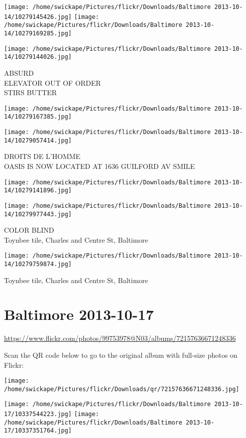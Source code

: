 \documentclass[10pt,letterpaper]{article}
\begin{document}
\texttt{[image: /home/swickape/Pictures/flickr/Downloads/Baltimore 2013-10-14/10279145426.jpg]}
\texttt{[image: /home/swickape/Pictures/flickr/Downloads/Baltimore 2013-10-14/10279169285.jpg]}

\texttt{[image: /home/swickape/Pictures/flickr/Downloads/Baltimore 2013-10-14/10279144026.jpg]}

ABSURD\\
ELEVATOR OUT OF ORDER\\
STIRS BUTTER
\pagebreak

\texttt{[image: /home/swickape/Pictures/flickr/Downloads/Baltimore 2013-10-14/10279167385.jpg]}

\vspace{0.25in}
\texttt{[image: /home/swickape/Pictures/flickr/Downloads/Baltimore 2013-10-14/10279057414.jpg]}

DROITS DE L'HOMME\\
OASIS IS NOW LOCATED AT 1636 GUILFORD AV SMILE
\pagebreak

\texttt{[image: /home/swickape/Pictures/flickr/Downloads/Baltimore 2013-10-14/10279141896.jpg]}

\vspace{0.25in}
\texttt{[image: /home/swickape/Pictures/flickr/Downloads/Baltimore 2013-10-14/10279977443.jpg]}

COLOR BLIND\\
Toynbee tile, Charles and Centre St, Baltimore
\pagebreak

\texttt{[image: /home/swickape/Pictures/flickr/Downloads/Baltimore 2013-10-14/10279759874.jpg]}

Toynbee tile, Charles and Centre St, Baltimore
\pagebreak

\section*{Baltimore 2013-10-17}

\url{https://www.flickr.com/photos/99753978@N03/albums/72157636671248336}

Scan the QR code below to go to the original album with full-size photos on Flickr:

\texttt{[image: /home/swickape/Pictures/flickr/Downloads/qr/72157636671248336.jpg]}
\pagebreak

\texttt{[image: /home/swickape/Pictures/flickr/Downloads/Baltimore 2013-10-17/10337544223.jpg]}
\texttt{[image: /home/swickape/Pictures/flickr/Downloads/Baltimore 2013-10-17/10337351764.jpg]}
\end{document}
